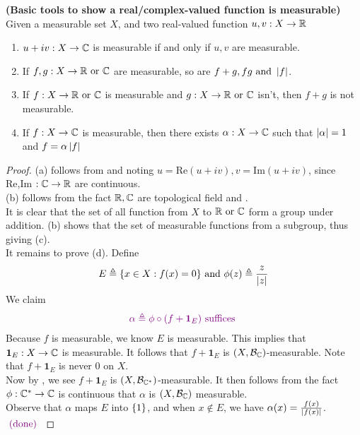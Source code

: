 \documentclass{report}
\begin{document}
\begin{theorem}
\label{Btsa}
\textbf{(Basic tools to show a real/complex-valued function is measurable)} Given a measurable set $X$, and two real-valued function $u,v:X\rightarrow \mathbb{R}$
\begin{enumerate}[label=(\alph*)]
  \item  $u+iv:X\rightarrow \mathbb{C}$ is measurable if and only if $u,v$ are measurable.
  \item If  $f,g:X\rightarrow \mathbb{R}\text{ or }\mathbb{C}$ are measurable, so are $f+g,fg\text{ and }\left|f\right|$.
  \item If $f:X\rightarrow \mathbb{R}\text{ or }\mathbb{C}$ is measurable and $g:X\rightarrow \mathbb{R}\text{ or }\mathbb{C}$ isn't, then $f+g$ is not measurable.
  \item If $f:X\rightarrow \mathbb{C}$ is measurable, then there exists $\alpha :X\rightarrow \mathbb{C}$ such that $\left|\alpha \right|=1$ and $f=\alpha \left|f\right|$
\end{enumerate}
\end{theorem}
\begin{proof}
(a) follows from  and noting $u=\text{Re}(u+iv),v=\text{Im}(u+iv)$, since Re,Im $:\mathbb{C}\rightarrow \mathbb{R}$ are continuous.\\

(b) follows from the fact $\mathbb{R},\mathbb{C}$ are topological field and . \\

It is clear that the set of all function from  $X$ to $\mathbb{R}\text{ or }\mathbb{C}$ form a group under addition. (b) shows that the set of measurable functions from a subgroup, thus giving (c).\\

It remains to prove (d). Define 
\begin{align*}
E\triangleq \{ x \in X: f(x)=0 \}\text{ and }\phi(z)\triangleq  \frac{z}{\left|z\right|}
\end{align*}
We claim 
\begin{align*}
  \textcolor{violet}{\alpha \triangleq \phi\circ (f+\textbf{1}_E)\text{ suffices }}
\end{align*}
Because $f$ is measurable, we know $E$ is measurable. This implies that $\textbf{1}_E:X\rightarrow \mathbb{C}$ is measurable. It follows that $f+\textbf{1}_E$ is $(X,\mathcal{B}_{\mathbb{C}})$-measurable. Note that $f+\textbf{1}_E$ is never $0$ on $X$.\\


Now by , we see $f+\textbf{1}_E$ is $(X,\mathcal{B}_{\mathbb{C}^*})$-measurable. It then follows from the fact  $\phi:\mathbb{C}^*\rightarrow \mathbb{C}$ is continuous that $\alpha $ is $(X,\mathcal{B}_{\mathbb{C}})$ measurable.\\

Observe that $\alpha$ maps $E$ into $\{ 1 \}$, and when $x\not\in E$, we have $\alpha (x)= \frac{f(x)}{\left|f(x)\right|}$. $\textcolor{violet}{\text{ (done) }}$
\end{proof}
\end{document}

